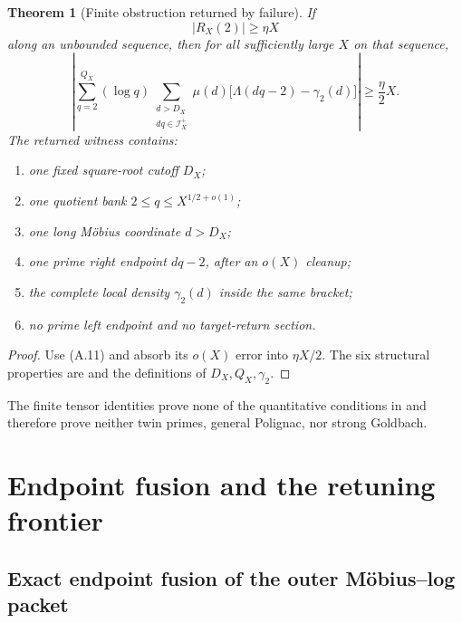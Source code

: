 \documentclass[11pt]{article}
\newtheorem{theorem}{Theorem}[section]
\theoremstyle{definition}
\theoremstyle{remark}
\begin{document}
\begin{theorem}[Finite obstruction returned by failure]
\label{thm:affouter-obstruction}
If
\[
 |R_X(2)|\ge\eta X
\]
along an unbounded sequence, then for all sufficiently large $X$ on that
sequence,
\begin{equation}
 \label{eq:affouter-obstruction}
 \boxed{
 \left|
 \sum_{q=2}^{Q_X}(\log q)
 \sum_{\substack{d>D_X\\dq\in\mathscr I_X^+}}
 \mu(d)
 \bigl[\Lambda(dq-2)-\gamma_2(d)\bigr]
 \right|
 \ge\frac\eta2X.}
 \tag{A.20}
\end{equation}
The returned witness contains:
\begin{enumerate}[label=\textup{(W\arabic*)},leftmargin=3em]
\item one fixed square-root cutoff $D_X$;
\item one quotient bank $2\le q\le X^{1/2+o(1)}$;
\item one long M\"obius coordinate $d>D_X$;
\item one prime right endpoint $dq-2$, after an $o(X)$ cleanup;
\item the complete local density $\gamma_2(d)$ inside the same bracket;
\item no prime left endpoint and no target-return section.
\end{enumerate}
\end{theorem}

\begin{proof}
Use \textup{(A.11)} and absorb its $o(X)$ error into $\eta X/2$.  The six structural
properties are
 and the definitions of
$D_X,Q_X,\gamma_2$.
\end{proof}

The finite tensor identities prove none of the quantitative conditions in
 and therefore prove neither twin primes, general
Polignac, nor strong Goldbach.



\section{Endpoint fusion and the retuning frontier}
\label{sec:affine-endpoint}

\subsection{Exact endpoint fusion of the outer M\"obius--log packet}
\label{subsec:affend-endpoint-fusion}
\end{document}
